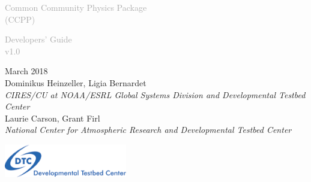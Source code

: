\begin{titlepage}
\renewcommand{\thefootnote}{\fnsymbol{footnote}}

\vspace*{1em}
\noindent

\begin{center}
\textcolor{darkgray}{\bigsf Common Community Physics Package\\[0.5ex] (CCPP)}
\vspace*{1em}

\textcolor{darkgray}{\bigst Developers' Guide\\[0.5ex] v1.0}
\vspace*{1em}

\large{March 2018}\\[4em]

Dominikus Heinzeller, Ligia Bernardet\\
\textit{\small{CIRES/CU at NOAA/ESRL Global Systems Division and Developmental Testbed Center}}\\[4em]

Laurie Carson, Grant Firl\\
\textit{\small{National Center for Atmospheric Research and Developmental Testbed Center}}\\[4em]

\vspace{4em}

\includegraphics[width=0.4\textwidth]{images/dtc_logo.png}\\[2em]

\end{center}
\end{titlepage}
\pagebreak{}
